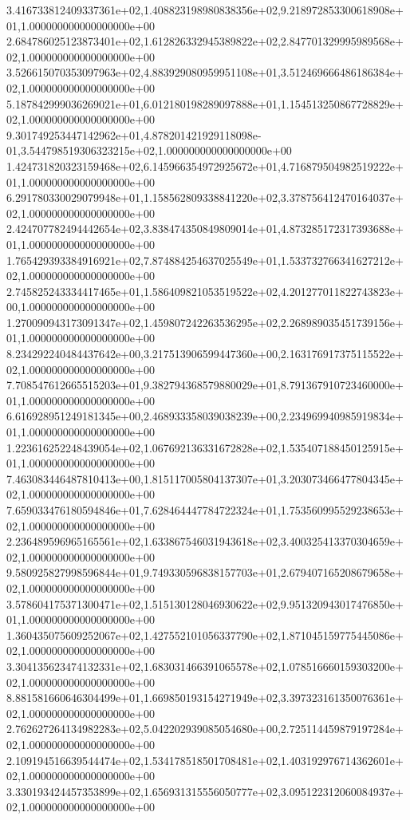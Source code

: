 3.416733812409337361e+02,1.408823198980838356e+02,9.218972853300618908e+01,1.000000000000000000e+00
2.684786025123873401e+02,1.612826332945389822e+02,2.847701329995989568e+02,1.000000000000000000e+00
3.526615070353097963e+02,4.883929080959951108e+01,3.512469666486186384e+02,1.000000000000000000e+00
5.187842999036269021e+01,6.012180198289097888e+01,1.154513250867728829e+02,1.000000000000000000e+00
9.301749253447142962e+01,4.878201421929118098e-01,3.544798519306323215e+02,1.000000000000000000e+00
1.424731820323159468e+02,6.145966354972925672e+01,4.716879504982519222e+01,1.000000000000000000e+00
6.291780330029079948e+01,1.158562809338841220e+02,3.378756412470164037e+02,1.000000000000000000e+00
2.424707782494442654e+02,3.838474350849809014e+01,4.873285172317393688e+01,1.000000000000000000e+00
1.765429393384916921e+02,7.874884254637025549e+01,1.533732766341627212e+02,1.000000000000000000e+00
2.745825243334417465e+01,1.586409821053519522e+02,4.201277011822743823e+00,1.000000000000000000e+00
1.270090943173091347e+02,1.459807242263536295e+02,2.268989035451739156e+01,1.000000000000000000e+00
8.234292240484437642e+00,3.217513906599447360e+00,2.163176917375115522e+02,1.000000000000000000e+00
7.708547612665515203e+01,9.382794368579880029e+01,8.791367910723460000e+01,1.000000000000000000e+00
6.616928951249181345e+00,2.468933358039038239e+00,2.234969940985919834e+01,1.000000000000000000e+00
1.223616252248439054e+02,1.067692136331672828e+02,1.535407188450125915e+01,1.000000000000000000e+00
7.463083446487810413e+00,1.815117005804137307e+01,3.203073466477804345e+02,1.000000000000000000e+00
7.659033476180594846e+01,7.628464447784722324e+01,1.753560995529238653e+02,1.000000000000000000e+00
2.236489596965165561e+02,1.633867546031943618e+02,3.400325413370304659e+02,1.000000000000000000e+00
9.580925827998596844e+01,9.749330596838157703e+01,2.679407165208679658e+02,1.000000000000000000e+00
3.578604175371300471e+02,1.515130128046930622e+02,9.951320943017476850e+01,1.000000000000000000e+00
1.360435075609252067e+02,1.427552101056337790e+02,1.871045159775445086e+02,1.000000000000000000e+00
3.304135623474132331e+02,1.683031466391065578e+02,1.078516660159303200e+02,1.000000000000000000e+00
8.881581660646304499e+01,1.669850193154271949e+02,3.397323161350076361e+02,1.000000000000000000e+00
2.762627264134982283e+02,5.042202939085054680e+00,2.725114459879197284e+02,1.000000000000000000e+00
2.109194516639544474e+02,1.534178518501708481e+02,1.403192976714362601e+02,1.000000000000000000e+00
3.330193424457353899e+02,1.656931315556050777e+02,3.095122312060084937e+02,1.000000000000000000e+00
